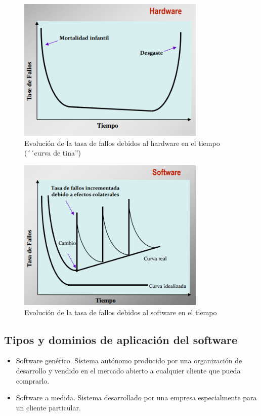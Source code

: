 \documentclass{article}
\begin{document}
\begin{figure}[h]
\centering
\label{tasa_hardware}
\caption{Evolución de la tasa de fallos debidos al hardware en el tiempo (´´curva de tina'')}
\includegraphics[scale=1,width=0.8\textwidth]{fallos_causados_hardware.png}
\end{figure}

\begin{figure}[h]
\centering
\label{tasa_software}
\caption{Evolución de la tasa de fallos debidos al software en el tiempo}
\includegraphics[scale=1,width=0.8\textwidth]{fallos_causados_software.png}
\end{figure}

\subsection{Tipos y dominios de aplicación del software}
\begin{itemize}
\item Software genérico. Sistema autónomo producido por una organización de desarrollo y vendido en el mercado abierto a cualquier cliente que pueda comprarlo.

\item Software a medida. Sistema desarrollado por una empresa especialmente para un cliente particular.

\end{itemize}
\end{document}

